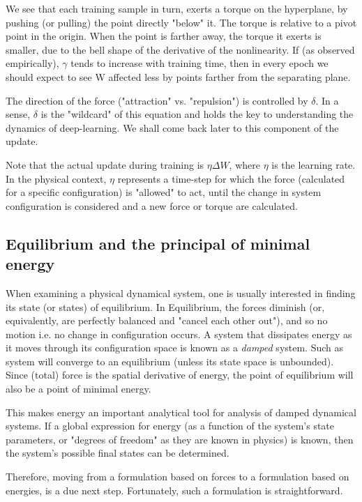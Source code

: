 \documentclass[]{article}
\begin{document}
 		We see that each training sample in turn, exerts a torque on the hyperplane, by pushing (or pulling) the point directly "below" it. The torque is relative to a pivot point in the origin. 
 		When the point is farther away, the torque it exerts is smaller, due to the bell shape of the derivative of the nonlinearity. If (as observed empirically), $\gamma$ tends to increase with training time, then in every epoch we should expect to see W affected less by points farther from the separating plane.
 		
 		The direction of the force ("attraction" vs. "repulsion") is controlled by $\delta$. In a sense, $\delta$ is the "wildcard" of this equation and holds the key to understanding the dynamics of deep-learning. We shall come back later to this component of the update.
 		
 		Note that the actual update during training is $\eta \Delta W$, where $\eta$ is the learning rate. In the physical context, $\eta$ represents a time-step for which the force (calculated for a specific configuration) is "allowed" to act, until the change in system configuration is considered and a new force or torque are calculated. 
 	
 	\subsection{Equilibrium and the principal of minimal energy}	
 		When examining a physical dynamical system, one is usually interested in finding its state (or states) of equilibrium. In Equilibrium, the forces diminish (or, equivalently, are perfectly balanced and "cancel each other out"), and so no motion i.e. no change in configuration occurs. A system that dissipates energy as it moves through its configuration space is known as a \textit{damped} system. Such as system will converge to an equilibrium (unless its state space is unbounded). Since (total) force is the spatial derivative of energy, the point of equilibrium will also be a point of minimal energy.
 		
 		This makes energy an important analytical tool for analysis of damped dynamical systems. If a global expression for energy (as a function of the system's state parameters, or "degrees of freedom" as they are known in physics) is known, then the system's possible final states can be determined.
 		
 		Therefore, moving from a formulation based on forces to a formulation based on energies, is a due next step. Fortunately, such a formulation is straightforward. 
 		
\end{document}
